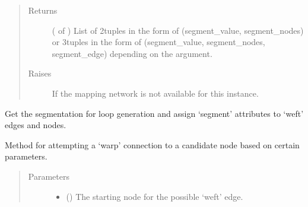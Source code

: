 \documentclass[letterpaper,10pt,english]{sphinxmanual}
\begin{document}
\begin{fulllineitems}
\begin{fulllineitems}
\begin{quote}
\begin{description}
\item[{Returns}] \leavevmode
{} ( of ) \textendash{} List of 2\sphinxhyphen{}tuples in the form of (segment\_value, segment\_nodes) or
3\sphinxhyphen{}tuples in the form of (segment\_value, segment\_nodes,
segment\_edge) depending on the  argument.

\item[{Raises}] \leavevmode
{\hyperref[\detokenize{cockatoo:cockatoo.exception.MappingNetworkError}]{}} \textendash{} If the mapping network is not available for this instance.

\end{description}\end{quote}

\end{fulllineitems}


\begin{fulllineitems}
\label{\detokenize{cockatoo:cockatoo.KnitNetwork.assign_segment_attributes}}
Get the segmentation for loop generation and assign ‘segment’
attributes to ‘weft’ edges and nodes.

\end{fulllineitems}


\begin{fulllineitems}
\label{\detokenize{cockatoo:cockatoo.KnitNetwork.attempt_warp_connection}}
Method for attempting a ‘warp’ connection to a candidate
node based on certain parameters.
\begin{quote}\begin{description}
\item[{Parameters}] \leavevmode\begin{itemize}
\item {} 
 () \textendash{} The starting node for the possible ‘weft’ edge.


\end{itemize}
\end{description}
\end{quote}
\end{fulllineitems}
\end{fulllineitems}
\end{document}
